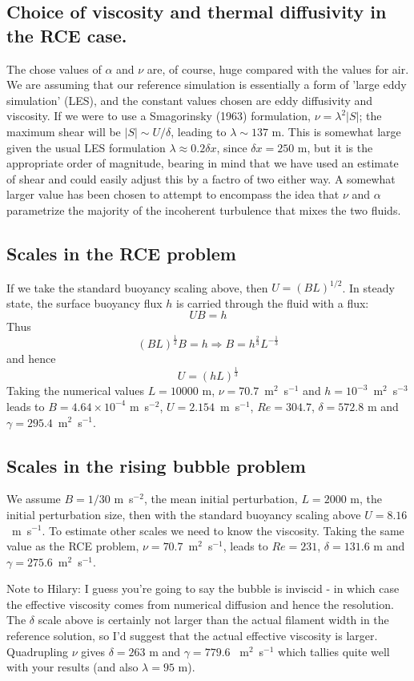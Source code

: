 \documentclass[a4paper,10pt]{article}
\begin{document}
\subsection{Choice of viscosity and thermal diffusivity in the RCE case.}
The chose values of $\alpha$ and $\nu$ are, of course, huge compared with the values for air.
We are assuming that our reference simulation is essentially a form of 'large eddy simulation' (LES), and the constant values chosen are eddy diffusivity and viscosity.
If we were to use a Smagorinsky (1963) formulation, $\nu = \lambda^2 \left|S\right|$; the maximum shear will be $\left|S\right|\sim U/\delta$, leading to $\lambda \sim 137$ m. 
This is somewhat large given the usual LES formulation $\lambda \approx 0.2 \delta x$, since $\delta x=250$ m, but it is the appropriate order of magnitude, bearing in mind that we have used an estimate of shear and could easily adjust this by a factro of two either way. 
A somewhat larger value has been chosen to attempt to encompass the idea that $\nu$ and $\alpha$ parametrize the majority of the incoherent turbulence that mixes the two fluids.   

\subsection{Scales in the RCE problem}
If we take the standard buoyancy scaling above, then $U=(BL)^{1/2}$. 
In steady state, the surface buoyancy flux $h$ is carried through the fluid with a flux:
\begin{equation}
UB = h
\end{equation}
Thus 
\begin{equation}
\left(BL\right)^\frac{1}{2} B = h \Rightarrow B = h^\frac{2}{3} L^{-\frac{1}{3}}
\end{equation}
and hence
\begin{equation}
U=\left(hL \right)^\frac{1}{3}
\end{equation}
Taking the numerical values $L=10000$ m, $\nu = 70.7$~m$^2$~s$^{-1}$ and $h=10^{-3}$~m$^2$~s$^{-3}$ leads to $B=4.64\times 10^{-4}$ m~s$^{-2}$, $U = 2.154$~m~s$^{-1}$, $Re=304.7$, $\delta=572.8$ m and $\gamma=295.4$~m$^2$~s$^{-1}$. 

\subsection{Scales in the rising bubble problem}
We assume $B=1/30$ m~s$^{-2}$, the mean initial perturbation, $L=2000$ m, the initial perturbation size, then with the standard buoyancy scaling above $U = 8.16$~m~s$^{-1}$. To estimate other scales we need to know the viscosity. Taking the same value as the RCE problem, $\nu = 70.7$~m$^2$~s$^{-1}$, leads to  $Re=231$, $\delta=131.6$ m and $\gamma=275.6$~m$^2$~s$^{-1}$. 

Note to Hilary: I guess you're going to say the bubble is inviscid - in which case the effective viscosity comes from numerical diffusion and hence the resolution. 
The $\delta$ scale above is certainly not larger than the actual filament width in the reference solution, so I'd suggest that the actual effective viscosity is larger. 
Quadrupling $\nu$ gives $\delta = 263$ m and $\gamma = 779.6$ ~m$^2$~s$^{-1}$ which tallies quite well with your results (and also $\lambda=95$ m).
\end{document}
